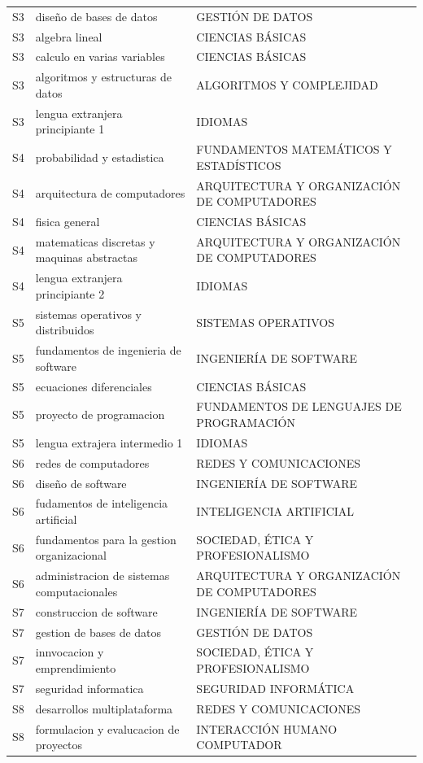 \documentclass[11pt,a4paper]{article}
\begin{document}
\begin{small}
\begin{longtable}{c >{\raggedright\arraybackslash}p{8.5cm} >{\raggedright\arraybackslash}p{5.5cm}}
S3 & diseño de bases de datos & GESTIÓN DE DATOS \\
S3 & algebra lineal & CIENCIAS BÁSICAS \\
S3 & calculo en varias variables & CIENCIAS BÁSICAS \\
S3 & algoritmos y estructuras de datos & ALGORITMOS Y COMPLEJIDAD \\
S3 & lengua extranjera principiante 1 & IDIOMAS \\
S4 & probabilidad y estadistica & FUNDAMENTOS MATEMÁTICOS Y ESTADÍSTICOS \\
S4 & arquitectura de computadores & ARQUITECTURA Y ORGANIZACIÓN DE COMPUTADORES \\
S4 & fisica general & CIENCIAS BÁSICAS \\
S4 & matematicas discretas y maquinas abstractas & ARQUITECTURA Y ORGANIZACIÓN DE COMPUTADORES \\
S4 & lengua extranjera principiante 2 & IDIOMAS \\
S5 & sistemas operativos y distribuidos & SISTEMAS OPERATIVOS \\
S5 & fundamentos de ingenieria de software & INGENIERÍA DE SOFTWARE \\
S5 & ecuaciones diferenciales & CIENCIAS BÁSICAS \\
S5 & proyecto de programacion & FUNDAMENTOS DE LENGUAJES DE PROGRAMACIÓN \\
S5 & lengua extrajera intermedio 1 & IDIOMAS \\
S6 & redes de computadores & REDES Y COMUNICACIONES \\
S6 & diseño de software & INGENIERÍA DE SOFTWARE \\
S6 & fudamentos de inteligencia artificial & INTELIGENCIA ARTIFICIAL \\
S6 & fundamentos para la gestion organizacional & SOCIEDAD, ÉTICA Y PROFESIONALISMO \\
S6 & administracion de sistemas computacionales & ARQUITECTURA Y ORGANIZACIÓN DE COMPUTADORES \\
S7 & construccion de software & INGENIERÍA DE SOFTWARE \\
S7 & gestion de bases de datos & GESTIÓN DE DATOS \\
S7 & innvocacion y emprendimiento & SOCIEDAD, ÉTICA Y PROFESIONALISMO \\
S7 & seguridad informatica & SEGURIDAD INFORMÁTICA \\
S8 & desarrollos multiplataforma & REDES Y COMUNICACIONES \\
S8 & formulacion y evalucacion de proyectos & INTERACCIÓN HUMANO COMPUTADOR \\

\end{longtable}
\end{small}
\end{document}
